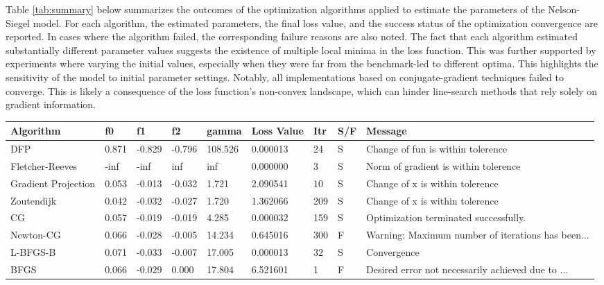 \documentclass[12pt]{article}
\begin{document}
Table \ref{tab:summary} below summarizes the outcomes of the optimization algorithms applied to estimate the parameters of the Nelson-Siegel model. For each algorithm, the estimated parameters, the final loss value, and the success status of the optimization convergence are reported. In cases where the algorithm failed, the corresponding failure reasons are also noted. The fact that each algorithm estimated substantially different parameter values suggests the existence of multiple local minima in the loss function. This was further supported by experiments where varying the initial values, especially when they were far from the benchmark-led to different optima. This highlights the sensitivity of the model to initial parameter settings.
Notably, all implementations based on conjugate-gradient techniques failed to converge. This is likely a consequence of the loss function’s non-convex landscape, which can hinder line-search methods that rely solely on gradient information.

\label{sec:results-data}
\begin{sidewaystable}
\centering

\begin{tabular}{|l |l |l |l |l |l |l |l |l|}\hline       
 Algorithm & f0 & f1 & f2 & gamma & Loss Value & Itr& S/F& Message\\\hline
 DFP & 0.871& -0.829& -0.796& 108.526& 0.000013
& 24& S& Change of fun is within tolerence
\\\hline
  Fletcher-Reeves& -inf& -inf& inf& inf& 0.000000
& 3& S& Norm of gradient is within tolerence
\\\hline
  Gradient Projection & 0.053& -0.013& -0.032& 1.721& 2.090541
& 10& S& Change of x is within tolerence
\\\hline
  Zoutendijk & 0.042& -0.032& -0.027& 1.720& 1.362066
& 209& S& Change of x is within tolerence
\\\hline
 CG & 0.057& -0.019& -0.019& 4.285& 0.000032
& 159& S& Optimization terminated successfully.
\\\hline
  Newton-CG & 0.066& -0.028& -0.005& 14.234& 0.645016
& 300& F& Warning: Maximum number of iterations has been...
\\\hline
  L-BFGS-B & 0.071& -0.033& -0.007& 17.005& 0.000013
& 32& S& Convergence\\\hline
  BFGS & 0.066& -0.029& 0.000& 17.804& 6.521601
& 1& F& Desired error not necessarily achieved due to ...
\\ \hline

\end{tabular}
  \caption{Performance result of manual algorithm and SciPy solvers }
  \label{tab:summary}
\end{sidewaystable}
\end{document}
